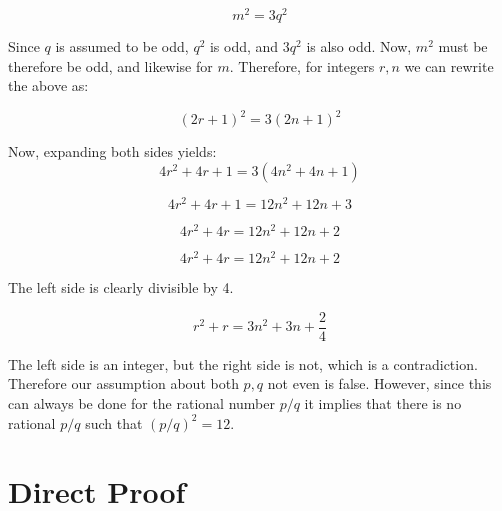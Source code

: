 $$m^{2}=3q^{2}$$

Since $q$ is assumed to be odd, $q^{2}$ is odd, and $3q^{2}$ is also odd.  Now, $m^{2}$ must be therefore be odd, and likewise for $m$.  Therefore, for integers $r,n$ we can rewrite the above as:

$$
\left(2r+1\right)^{2}=3\left(2n+1\right)^{2}
$$

Now, expanding both sides yields:
$$
4r^{2}+4r+1=3\left(4n^{2}+4n+1\right)
$$

$$
4r^{2}+4r+1=12n^{2}+12n+3
$$

$$
4r^{2}+4r=12n^{2}+12n+2
$$

$$
4r^{2}+4r=12n^{2}+12n+2
$$

The left side is clearly divisible by 4.

$$
r^{2}+r=3n^{2}+3n+\frac{2}{4}
$$

The left side is an integer, but the right side is not, which is a contradiction. Therefore our assumption about both $p,q$ not even is false.  However, since this can always be done for the rational number $p/q$ it implies that there is no rational $p/q$ such that $\left(p/q\right)^{2}=12.$


\section{Direct Proof}